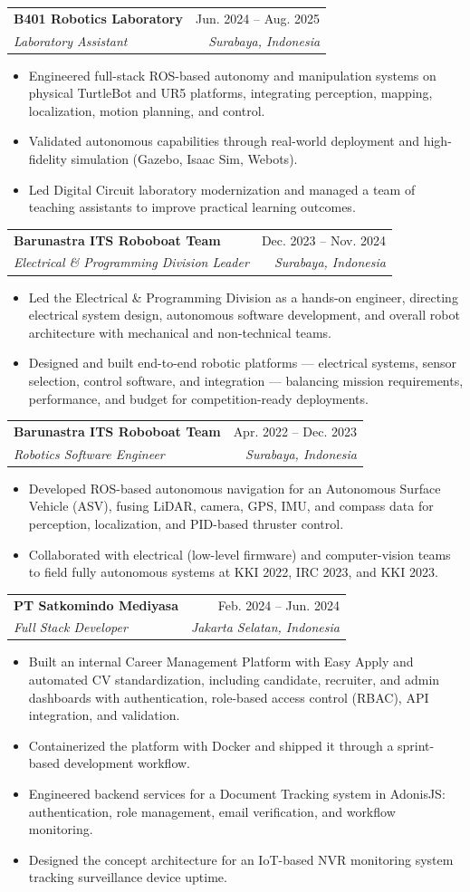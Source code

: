 \documentclass[a4paper,11pt]{article}
\makeatletter
\newcommand{\resumeItem}[1]{
  \item\small{
    {#1 \vspace{-2pt}}
  }
}
\newcommand{\resumeSubheading}[4]{
  \vspace{-2pt}\item
    \begin{tabular*}{0.97\textwidth}[t]{l@{\extracolsep{\fill}}r}
      \textbf{#1} & #2 \\
      \textit{\small#3} & \textit{\small #4} \\
    \end{tabular*}\vspace{-7pt}
}
\newcommand{\resumeItemListStart}{\begin{itemize}}
\newcommand{\resumeItemListEnd}{\end{itemize}\vspace{-5pt}}
\makeatother
\begin{document}
    \resumeSubheading
      {B401 Robotics Laboratory}{Jun. 2024 -- Aug. 2025}
      {Laboratory Assistant}{Surabaya, Indonesia}
      \resumeItemListStart
        \resumeItem{Engineered full-stack ROS-based autonomy and manipulation systems on physical TurtleBot and UR5 platforms, integrating perception, mapping, localization, motion planning, and control.}
        \resumeItem{Validated autonomous capabilities through real-world deployment and high-fidelity simulation (Gazebo, Isaac Sim, Webots).}
        \resumeItem{Led Digital Circuit laboratory modernization and managed a team of teaching assistants to improve practical learning outcomes.}
      \resumeItemListEnd

    \resumeSubheading
      {Barunastra ITS Roboboat Team}{Dec. 2023 -- Nov. 2024}
      {Electrical \& Programming Division Leader}{Surabaya, Indonesia}
      \resumeItemListStart
        \resumeItem{Led the Electrical \& Programming Division as a hands-on engineer, directing electrical system design, autonomous software development, and overall robot architecture with mechanical and non-technical teams.}
        \resumeItem{Designed and built end-to-end robotic platforms --- electrical systems, sensor selection, control software, and integration --- balancing mission requirements, performance, and budget for competition-ready deployments.}
      \resumeItemListEnd

    \resumeSubheading
      {Barunastra ITS Roboboat Team}{Apr. 2022 -- Dec. 2023}
      {Robotics Software Engineer}{Surabaya, Indonesia}
      \resumeItemListStart
        \resumeItem{Developed ROS-based autonomous navigation for an Autonomous Surface Vehicle (ASV), fusing LiDAR, camera, GPS, IMU, and compass data for perception, localization, and PID-based thruster control.}
        \resumeItem{Collaborated with electrical (low-level firmware) and computer-vision teams to field fully autonomous systems at KKI 2022, IRC 2023, and KKI 2023.}
      \resumeItemListEnd

    \resumeSubheading
      {PT Satkomindo Mediyasa}{Feb. 2024 -- Jun. 2024}
      {Full Stack Developer}{Jakarta Selatan, Indonesia}
      \resumeItemListStart
        \resumeItem{Built an internal Career Management Platform with Easy Apply and automated CV standardization, including candidate, recruiter, and admin dashboards with authentication, role-based access control (RBAC), API integration, and validation.}
        \resumeItem{Containerized the platform with Docker and shipped it through a sprint-based development workflow.}
        \resumeItem{Engineered backend services for a Document Tracking system in AdonisJS: authentication, role management, email verification, and workflow monitoring.}
        \resumeItem{Designed the concept architecture for an IoT-based NVR monitoring system tracking surveillance device uptime.}
      \resumeItemListEnd
\end{document}
